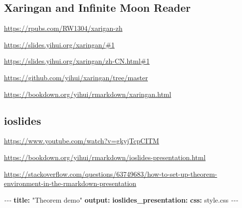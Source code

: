 \documentclass[
]{book}
\newenvironment{Shaded}{\begin{snugshade}}{\end{snugshade}}
\newcommand{\AttributeTok}[1]{\textcolor[rgb]{0.13,0.29,0.53}{#1}}
\newcommand{\FunctionTok}[1]{\textcolor[rgb]{0.13,0.29,0.53}{\textbf{#1}}}
\newcommand{\KeywordTok}[1]{\textcolor[rgb]{0.13,0.29,0.53}{\textbf{#1}}}
\newcommand{\PreprocessorTok}[1]{\textcolor[rgb]{0.56,0.35,0.01}{\textit{#1}}}
\newcommand{\StringTok}[1]{\textcolor[rgb]{0.31,0.60,0.02}{#1}}
\theoremstyle{definition}
\theoremstyle{definition}
\theoremstyle{definition}
\theoremstyle{definition}
\theoremstyle{remark}
\begin{document}
\hypertarget{xaringan-and-infinite-moon-reader}{%
\subsection{Xaringan and Infinite Moon Reader}\label{xaringan-and-infinite-moon-reader}}

\url{https://rpubs.com/RW1304/xarigan-zh}

\url{https://slides.yihui.org/xaringan/\#1}

\url{https://slides.yihui.org/xaringan/zh-CN.html\#1}

\url{https://github.com/yihui/xaringan/tree/master}

\url{https://bookdown.org/yihui/rmarkdown/xaringan.html}

\hypertarget{ioslides}{%
\subsection{ioslides}\label{ioslides}}

\url{https://www.youtube.com/watch?v=gkyjTcpCITM}

\url{https://bookdown.org/yihui/rmarkdown/ioslides-presentation.html}

\url{https://stackoverflow.com/questions/63749683/how-to-set-up-theorem-environment-in-the-rmarkdown-presentation}

\begin{Shaded}
\begin{Highlighting}[]
\PreprocessorTok{{-}{-}{-}}
\FunctionTok{title}\KeywordTok{:}\AttributeTok{ }\StringTok{"Theorem demo"}
\FunctionTok{output}\KeywordTok{:}
\AttributeTok{  }\FunctionTok{ioslides\_presentation}\KeywordTok{:}
\AttributeTok{    }\FunctionTok{css}\KeywordTok{:}\AttributeTok{ style.css}
\PreprocessorTok{{-}{-}{-}}
\end{Highlighting}
\end{Shaded}
\end{document}
